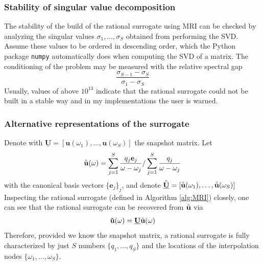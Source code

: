 \documentclass[11pt, a4paper]{article}
\begin{document}
\subsubsection{Stability of singular value decomposition}
\label{subsubsec:svd}
The stability of the build of the rational surrogate using \acrshort{MRI}
can be checked by analyzing the singular values $\sigma_1, \dots, \sigma_S$ 
obtained from performing the \acrshort{SVD}. Assume these values to be
ordered in descending order, which the Python package
\texttt{numpy} automatically does when computing the \acrshort{SVD} of a matrix. 
The conditioning of the problem may be measured with the relative
spectral gap \cite{davidePHD}
\begin{equation}
    \frac{\sigma_{S-1} - \sigma_S}{\sigma_1 - \sigma_S} \label{equ:spectral-gap}
\end{equation}
Usually, values of above $10^{13}$ indicate that the rational surrogate could not
be built in a stable way and in my implementations the user is warned.

\subsubsection{Alternative representations of the surrogate}
\label{subsubsec:u-ring}
Denote with $\mathbf{\underline{U}} = [\mathbf{u}(\omega_1), \dots, \mathbf{u}(\omega_S)]$
the snapshot matrix. Let 
\begin{equation}
    \accentset{\circ}{\mathbf{u}}(\omega) = \sum_{j=1}^S \frac{q_j \mathbf{e}_j}{\omega - \omega_j}
    / \sum_{j=1}^S \frac{q_j}{\omega - \omega_j} \label{equ:u-ring}
\end{equation}
with the canonical basis vectors $\{ \mathbf{e}_j \}_j$, and denote
$\accentset{\circ}{\mathbf{\underline{U}}} = [\accentset{\circ}{\mathbf{u}}(\omega_1), \dots, \accentset{\circ}{\mathbf{u}}(\omega_S)]$
Inspecting the rational surrogate (defined in Algorithm \ref{alg:MRI}) closely,
one can see that the rational surrogate can be recovered from $\accentset{\circ}{\mathbf{u}}$
via
\begin{equation}
    \mathbf{\tilde{u}}(\omega) = \mathbf{\underline{U}} \accentset{\circ}{\mathbf{u}}(\omega)
\end{equation}
Therefore, provided we know the snapshot matrix, a rational surrogate is
fully characterized by just $S$ numbers $\{q_1, \dots, q_S\}$
and the locations of the interpolation nodes $\{\omega_1, \dots, \omega_S\}$.
\end{document}
